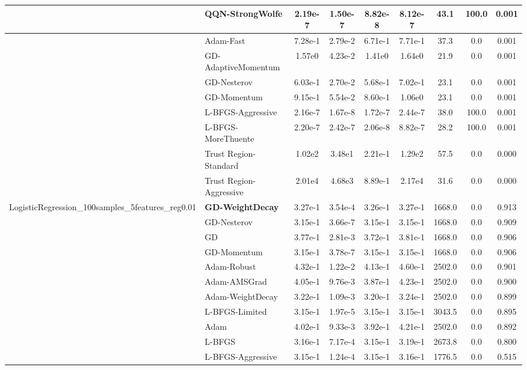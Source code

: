 \documentclass[10pt]{article}
\begin{document}
\begin{longtable}{|l|l|c|c|c|c|c|c|c|}
\hline
 & QQN-StrongWolfe & 2.19e-7 & 1.50e-7 & 8.82e-8 & 8.12e-7 & 43.1 & 100.0 & 0.001 \\
\hline
 & Adam-Fast & 7.28e-1 & 2.79e-2 & 6.71e-1 & 7.71e-1 & 37.3 & 0.0 & 0.001 \\
\hline
 & GD-AdaptiveMomentum & 1.57e0 & 4.23e-2 & 1.41e0 & 1.64e0 & 21.9 & 0.0 & 0.001 \\
\hline
 & GD-Nesterov & 6.03e-1 & 2.70e-2 & 5.68e-1 & 7.02e-1 & 23.1 & 0.0 & 0.001 \\
\hline
 & GD-Momentum & 9.15e-1 & 5.54e-2 & 8.60e-1 & 1.06e0 & 23.1 & 0.0 & 0.001 \\
\hline
 & L-BFGS-Aggressive & 2.16e-7 & 1.67e-8 & 1.72e-7 & 2.44e-7 & 38.0 & 100.0 & 0.001 \\
\hline
 & L-BFGS-MoreThuente & 2.20e-7 & 2.42e-7 & 2.06e-8 & 8.82e-7 & 28.2 & 100.0 & 0.001 \\
\hline
 & Trust Region-Standard & 1.02e2 & 3.48e1 & 2.21e-1 & 1.29e2 & 57.5 & 0.0 & 0.000 \\
\hline
 & Trust Region-Aggressive & 2.01e4 & 4.68e3 & 8.89e-1 & 2.17e4 & 31.6 & 0.0 & 0.000 \\
LogisticRegression\_100samples\_5features\_reg0.01 & \textbf{GD-WeightDecay} & 3.27e-1 & 3.54e-4 & 3.26e-1 & 3.27e-1 & 1668.0 & 0.0 & 0.913 \\
\hline
 & GD-Nesterov & 3.15e-1 & 3.66e-7 & 3.15e-1 & 3.15e-1 & 1668.0 & 0.0 & 0.909 \\
\hline
 & GD & 3.77e-1 & 2.81e-3 & 3.72e-1 & 3.81e-1 & 1668.0 & 0.0 & 0.906 \\
\hline
 & GD-Momentum & 3.15e-1 & 3.78e-7 & 3.15e-1 & 3.15e-1 & 1668.0 & 0.0 & 0.906 \\
\hline
 & Adam-Robust & 4.32e-1 & 1.22e-2 & 4.13e-1 & 4.60e-1 & 2502.0 & 0.0 & 0.901 \\
\hline
 & Adam-AMSGrad & 4.05e-1 & 9.76e-3 & 3.87e-1 & 4.23e-1 & 2502.0 & 0.0 & 0.900 \\
\hline
 & Adam-WeightDecay & 3.22e-1 & 1.09e-3 & 3.20e-1 & 3.24e-1 & 2502.0 & 0.0 & 0.899 \\
\hline
 & L-BFGS-Limited & 3.15e-1 & 1.97e-5 & 3.15e-1 & 3.15e-1 & 3043.5 & 0.0 & 0.895 \\
\hline
 & Adam & 4.02e-1 & 9.33e-3 & 3.92e-1 & 4.21e-1 & 2502.0 & 0.0 & 0.892 \\
\hline
 & L-BFGS & 3.16e-1 & 7.17e-4 & 3.15e-1 & 3.19e-1 & 2673.8 & 0.0 & 0.800 \\
\hline
 & L-BFGS-Aggressive & 3.15e-1 & 1.24e-4 & 3.15e-1 & 3.16e-1 & 1776.5 & 0.0 & 0.515 \\

\end{longtable}
\end{document}
